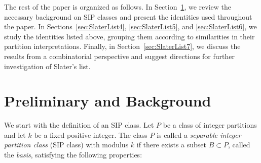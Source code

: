 \documentclass[12pt]{amsart}
\theoremstyle{definition}
\theoremstyle{remark}
\numberwithin{equation}{section}
\begin{document}
The rest of the paper is organized as follows. In Section~\ref{Sec:preliminary}, we review the necessary background on SIP classes and present the identities used throughout the paper. In Sections~\ref{sec:SlaterList4}, \ref{sec:SlaterList5}, and \ref{sec:SlaterList6}, we study the identities listed above, grouping them according to similarities in their partition interpretations. Finally, in Section~\ref{sec:SlaterList7}, we discuss the results from a combinatorial perspective and suggest directions for further investigation of Slater's list.

\section{Preliminary and Background}\label{Sec:preliminary}
We start with the definition of an SIP class. Let $P$ be a class of integer partitions and let $k$ be a fixed positive integer. The class $P$ is called a \emph{separable integer partition class} (SIP class) with modulus $k$ if there exists a subset $B\subset P$, called the \emph{basis}, satisfying the following properties:
\end{document}
